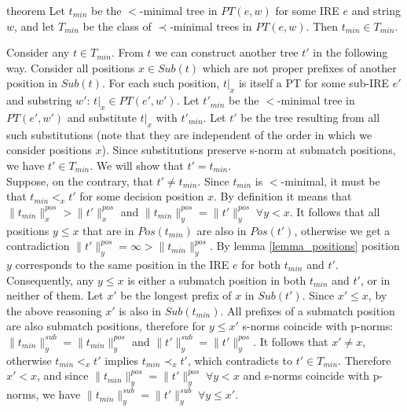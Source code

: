 \documentclass[AMA,STIX1COL]{WileyNJD-v2}
\newcommand{\PT}{PT}
\newcommand{\pnorm}[2]{\|{#1}\|^{pos}_{#2}}
\newcommand{\snorm}[2]{\|{#1}\|^{sub}_{#2}}
\begin{document}
\begin{theoremEnd}[restate, no link to proof, no link to theorem, category=theorem_order_compat]{theorem}
    \label{theorem_order_compat}
    Let $t_{min}$ be the $<$-minimal tree in $\PT(e, w)$ for some IRE $e$ and string $w$,
    and let $T_{min}$ be the class of $\prec$-minimal trees in $\PT(e, w)$.
    Then $t_{min} \in T_{min}$.
\end{theoremEnd}
\begin{proofEnd}
    Consider any $t \in T_{min}$.
    From $t$ we can construct another tree $t'$ in the following way.
    Consider all positions $x \in Sub(t)$ which are not proper prefixes of another position in $Sub(t)$.
    For each such position, $t|_x$ is itself a PT for some sub-IRE $e'$ and substring $w'$: $t|_x \in \PT(e', w')$.
    Let $t'_{min}$ be the $<$-minimal tree in $\PT(e', w')$ and substitute $t|_x$ with $t'_{min}$.
    Let $t'$ be the tree resulting from all such substitutions
    (note that they are independent of the order in which we consider positions $x$).
    Since substitutions preserve s-norm at submatch positions, we have $t' \in T_{min}$.
    We will show that $t' = t_{min}$.
    \\[0.5em]
    Suppose, on the contrary, that $t' \neq t_{min}$.
    Since $t_{min}$ is $<$-minimal, it must be that $t_{min} <_x t'$ for some decision position $x$.
    By definition it means that $\pnorm{t_{min}}{x} > \pnorm{t'}{x}$ and $\pnorm{t_{min}}{y} = \pnorm{t'}{y} \; \forall y < x$.
    It follows that all positions $y \leq x$ that are in $Pos(t_{min})$ are also in $Pos(t')$, otherwise we get a contradiction $\pnorm{t'}{y} = \infty > \pnorm{t_{min}}{y}$.
    By lemma \ref{lemma_positions} position $y$ corresponds to the same position in the IRE $e$ for both $t_{min}$ and $t'$.
    Consequently, any $y \leq x$ is either a submatch position in both $t_{min}$ and $t'$, or in neither of them.
    Let $x'$ be the longest prefix of $x$ in $Sub(t')$.
    Since $x' \leq x$, by the above reasoning $x'$ is also in $Sub(t_{min})$.
    All prefixes of a submatch position are also submatch positions,
    therefore for $y \leq x'$ s-norms coincide with p-norms: $\snorm{t_{min}}{y} = \pnorm{t_{min}}{y}$ and $\snorm{t'}{y} = \pnorm{t'}{y}$.
    It follows that $x' \neq x$, otherwise $t_{min} <_x t'$ implies $t_{min} \prec_x t'$, which contradicts to $t' \in T_{min}$.
    Therefore $x' < x$,
    and since $\pnorm{t_{min}}{y} = \pnorm{t'}{y} \; \forall y < x$ and s-norms coincide with p-norms,
    we have $\snorm{t_{min}}{y} = \snorm{t'}{y} \; \forall y \leq x'$.

\end{proofEnd}
\end{document}
